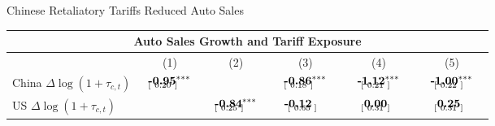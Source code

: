 \documentclass[9pt,pdftex,aspectratio=1610]{beamer}
\theoremstyle{definition}
\begin{document}
\begin{frame}[t]{Chinese Retaliatory Tariffs Reduced Auto Sales}
\vspace{-0.25cm}
\footnotesize
\begin{table}[t]
\footnotesize
\setlength {\tabcolsep}{.15mm}
\renewcommand{\arraystretch}{1.5}
\begin{center}
\begin{tabular}{l c c c c c}
\multicolumn{6}{c}{\small \textbf{Auto Sales Growth and Tariff Exposure}}\\
\hline
\hline
& (1) & (2) &  (3)  & (4)  &  (5) \\
\cmidrule(lr){2-6}
China $\Delta \log (1 + \tau_{c,t})$
&  $\begin{array}{c}\textbf{-0.95}^{***}  \vspace{-.32cm}\\ \scriptstyle [ \ 0.20 \ ]\phantom{^{***}}\end{array}$
&
&  $\begin{array}{c}\textbf{-0.86}^{***}  \vspace{-.32cm}\\ \scriptstyle [ \ 0.18 \ ]\phantom{^{***}}\end{array}$
& $\begin{array}{c}\textbf{-1.12}^{***} \vspace{-.32cm}\\ \scriptstyle \phantom{-}[ \ 0.21 \ ]\phantom{^{***}}\end{array}$
& $\begin{array}{c}\textbf{-1.00}^{***} \vspace{-.32cm}\\ \scriptstyle \phantom{-}[ \ 0.22 \ ]\phantom{^{***}}\end{array}$\\

US $\Delta \log (1 + \tau_{c,t})$
&
& $\begin{array}{c}\textbf{-0.84}^{***}  \vspace{-.32cm}\\ \scriptstyle [ \ 0.25 \ ]\phantom{^{***}}\end{array}$
&  $\begin{array}{c}\textbf{-0.12}\phantom{^{***}} \vspace{-.32cm}\\ \scriptstyle \phantom{-}[ \ 0.65 \ ]\phantom{^{***}}\end{array}$
& $\begin{array}{c}\phantom{-}\textbf{0.00}\phantom{^{***}} \vspace{-.32cm}\\ \scriptstyle \phantom{-}[ \ 0.31 \ ]\phantom{^{***}}\end{array}$
& $\begin{array}{c}\phantom{-}\textbf{0.25}\phantom{^{***}}  \vspace{-.32cm}\\ \scriptstyle \phantom{-}[ \ 0.31 \ ]\phantom{^{***}}\end{array}$\\


\end{tabular}
\end{center}
\end{table}
\end{frame}
\end{document}
